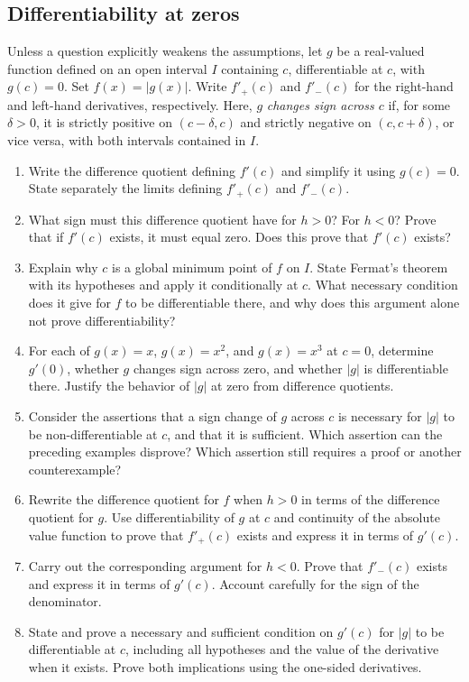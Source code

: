 \documentclass{self-check}
\begin{document}
\subsection*{Differentiability at zeros}
Unless a question explicitly weakens the assumptions, let $g$ be a real-valued function defined on an open interval $I$ containing $c$, differentiable at $c$, with $g(c)=0$. Set $f(x)=|g(x)|$. Write $f'_+(c)$ and $f'_-(c)$ for the right-hand and left-hand derivatives, respectively.
Here, $g$ \emph{changes sign across $c$} if, for some $\delta>0$, it is strictly positive on $(c-\delta,c)$ and strictly negative on $(c,c+\delta)$, or vice versa, with both intervals contained in $I$.

\begin{enumerate}[resume]
\item Write the difference quotient defining $f'(c)$ and simplify it using $g(c)=0$. State separately the limits defining $f'_+(c)$ and $f'_-(c)$.
\item What sign must this difference quotient have for $h>0$? For $h<0$? Prove that if $f'(c)$ exists, it must equal zero. Does this prove that $f'(c)$ exists?
\item Explain why $c$ is a global minimum point of $f$ on $I$. State Fermat's theorem with its hypotheses and apply it conditionally at $c$. What necessary condition does it give for $f$ to be differentiable there, and why does this argument alone not prove differentiability?
\item For each of $g(x)=x$, $g(x)=x^2$, and $g(x)=x^3$ at $c=0$, determine $g'(0)$, whether $g$ changes sign across zero, and whether $|g|$ is differentiable there. Justify the behavior of $|g|$ at zero from difference quotients.
\item Consider the assertions that a sign change of $g$ across $c$ is necessary for $|g|$ to be non-differentiable at $c$, and that it is sufficient. Which assertion can the preceding examples disprove? Which assertion still requires a proof or another counterexample?
\item Rewrite the difference quotient for $f$ when $h>0$ in terms of the difference quotient for $g$. Use differentiability of $g$ at $c$ and continuity of the absolute value function to prove that $f'_+(c)$ exists and express it in terms of $g'(c)$.
\item Carry out the corresponding argument for $h<0$. Prove that $f'_-(c)$ exists and express it in terms of $g'(c)$. Account carefully for the sign of the denominator.
\item State and prove a necessary and sufficient condition on $g'(c)$ for $|g|$ to be differentiable at $c$, including all hypotheses and the value of the derivative when it exists. Prove both implications using the one-sided derivatives.

\end{enumerate}
\end{document}
